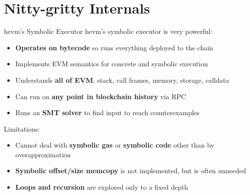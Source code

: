 \documentclass[aspectratio=169]{beamer}
\begin{document}

\section{Nitty-gritty Internals}
\begin{frame}{hevm's Symbolic Executor}
hevm's symbolic executor is very powerful:
\begin{itemize}
\item \textbf{Operates on bytecode} so runs everything deployed to the chain
\item Implements EVM semantics for concrete and symbolic execution
\item Understands \textbf{all of EVM}: stack, call frames, memory, storage, calldata
\item Can run on \textbf{any point in blockchain history} via RPC
\item Runs an \textbf{SMT solver} to find input to reach counterexamples
\end{itemize}
\bigskip

Limitations:
\begin{itemize}
\item Cannot deal with \textbf{symbolic gas} or \textbf{symbolic code} other than
    by overapproximation
\item \textbf{Symbolic offset/size memcopy} is not implemented, but is often unneeded
\item \textbf{Loops and recursion} are explored only to a fixed depth
\end{itemize}
\end{frame}
\end{document}
